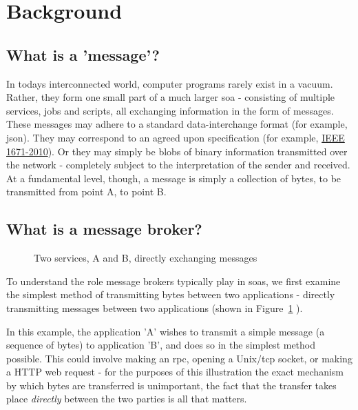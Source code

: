 \section{Background}
\label{sec:Background}

\subsection{What is a 'message'?}
\label{sub:What is a 'message'?}

In todays interconnected world, computer programs rarely exist in a vacuum.
Rather, they form one small part of a much larger \gls{soa} -
consisting of multiple services, jobs and scripts, all exchanging information in
the form of messages. These messages may adhere to a standard data-interchange
format (for example, \gls{json}). They may correspond to an agreed upon
specification (for example, \href{https://goo.gl/rjuP4C}{IEEE 1671-2010}).
Or they may simply be blobs of binary information transmitted over the network -
completely subject to the interpretation of the sender and received.
At a fundamental level, though, a message is simply a collection of bytes, to be
transmitted from point A, to point B.

\subsection{What is a message broker?}
\label{sub:What is a message broker?}

\begin{figure}
  
  \caption{Two services, A and B, directly exchanging messages}
  \label{fig:tikz:directMessaging}
\end{figure}

To understand the role message brokers typically play in \glspl{soa}, we first
examine the simplest method of transmitting bytes between two applications -
directly transmitting messages between two applications (shown in
Figure~\ref{fig:tikz:directMessaging} ).

In this example, the application 'A' wishes to transmit a simple message
(a sequence of bytes) to application 'B', and does so in the simplest method
possible. This could involve making an \gls{rpc}, opening a Unix/\gls{tcp} socket,
or making a HTTP web request - for the purposes of this illustration the exact
mechanism by which bytes are transferred is unimportant, the fact
that the transfer takes place \emph{directly} between the two parties is all that
matters.
